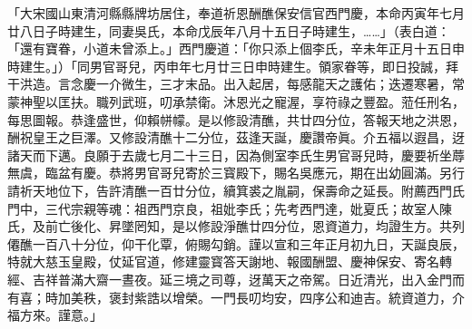 \begin{myquote}[\markfont]
「大宋國山東清河縣縣牌坊居住，奉道祈恩酬醮保安信官西門慶，本命丙寅年七月廿八日子時建生，同妻吳氏，本命戊辰年八月十五日子時建生，……」{\kaishu（表白道：「還有寶眷，小道未曾添上。」西門慶道：「你只添上個李氏，辛未年正月十五日申時建生。」）}「同男官哥兒，丙申年七月廿三日申時建生。領家眷等，即日投誠，拜干洪造。言念慶一介微生，三才末品。出入起居，每感龍天之護佑；迭遷寒暑，常蒙神聖以匡扶。職列武班，叨承禁衛。沐恩光之寵渥，享符祿之豐盈。蒞任刑名，每思圖報。恭逢盛世，仰賴帡幪。是以修設清醮，共廿四分位，答報天地之洪恩，酬祝皇王之巨澤。又修設清醮十二分位，茲逢天誕，慶讚帝眞。介五福以遐昌，迓諸天而下邁。良願于去歲七月二十三日，因為側室李氏生男官哥兒時，慶要祈坐蓐無虞，臨盆有慶。恭將男官哥兒寄於三寳殿下，賜名吳應元，期在出幼圓滿。另行請祈天地位下，告許清醮一百廿分位，續箕裘之胤嗣，保壽命之延長。附薦西門氏門中，三代宗親等魂：祖西門京良，祖妣李氏；先考西門達，妣夏氏；故室人陳氏，及前亡後化、昇墜罔知，是以修設淨醮廿四分位，恩資道力，均證生方。共列僊醮一百八十分位，仰干化覃，俯賜勾銷。謹以宣和三年正月初九日，天誕良辰，特就大慈玉皇殿，仗延官道，修建靈寳答天謝地、報國酬盟、慶神保安、寄名轉經、吉祥普滿大齋一晝夜。延三境之司尊，迓萬天之帝駕。日近清光，出入金門而有喜；時加美秩，褒封紫誥以增榮。一門長叨均安，四序公和迪吉。統資道力，介福方來。謹意。」
\end{myquote}

